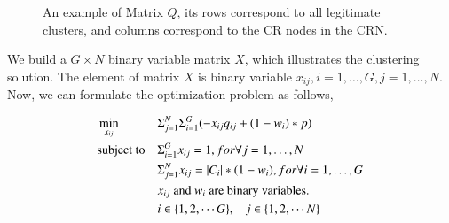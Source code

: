\documentclass[10pt,journal,compsoc]{IEEEtran}
\theoremstyle{mytheoremstyle}
\theoremstyle{mytheoremstyle}
\theoremstyle{mytheoremstyle}
\begin{document}
\begin{figure}[ht!]
\centering
{}	
\caption{An example of Matrix $Q$, its rows correspond to all legitimate clusters, and columns correspond to the CR nodes in the CRN.}
\label{xx}
\end{figure}

We build a $G\times N$ binary variable matrix $X$, which illustrates the clustering solution.
The element of matrix $X$ is binary variable $x_{ij}, i=1, \ldots, G, j=1, \ldots, N$.
Now, we can formulate the optimization problem as follows,

\begin{equation}
\begin{aligned}
     &\min\limits_{x_{ij}} && \Sigma_{j=1}^N\Sigma_{i=1}^G (-x_{ij}q_{ij} + (1-w_i)*p) \\
     &\text{subject to}   && \Sigma_{i=1}^G x_{ij} = 1, for \forall j=1, \ldots, N \\
   &&& \Sigma_{j=1}^N x_{ij} = |C_i|*(1-w_i), for \forall i=1, \ldots, G \\
   &&& \text{$x_{ij}$ and $w_i$ are binary variables.}\\
   &&& i\in \{1,2, \cdots G\}, \hspace{0.3cm} j\in \{1,2,\cdots N\}
\notag
\end{aligned}
\end{equation}
\end{document}
